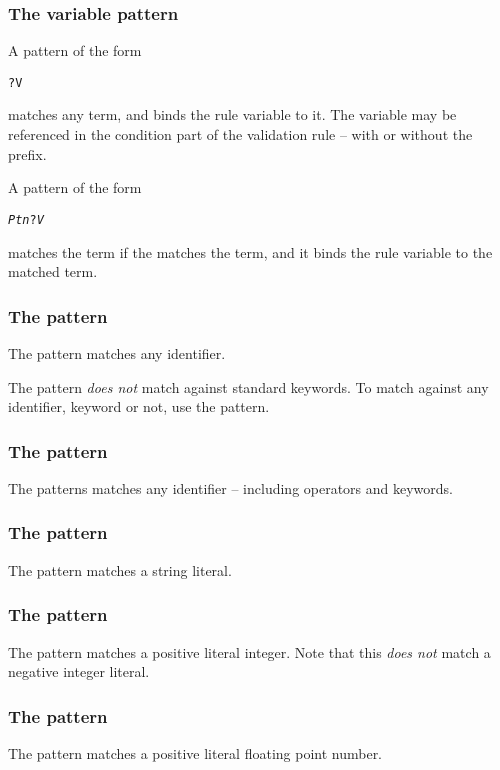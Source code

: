 \subsubsection{The variable pattern}
A pattern of the form 
\begin{alltt}
?V
\end{alltt}
matches any term, and binds the rule variable  to it. The variable may be referenced in the condition part of the validation rule -- with or without the  prefix.

A pattern of the form
\begin{alltt}
\emph{Ptn}?\emph{V}
\end{alltt}
matches the term if the  matches the term, and it binds the rule variable  to the matched term.

\subsubsection{The  pattern}
The  pattern matches any identifier.
\begin{aside}
The  pattern \emph{does not} match against standard keywords. To match against any identifier, keyword or not, use the  pattern.
\end{aside}

\subsubsection{The  pattern}
The  patterns matches any identifier -- including operators and keywords.

\subsubsection{The  pattern}
The  pattern matches a string literal.

\subsubsection{The  pattern}
The  pattern matches a positive literal integer. Note that this \emph{does not} match a negative integer literal.

\subsubsection{The  pattern}
The  pattern matches a positive literal floating point number.

